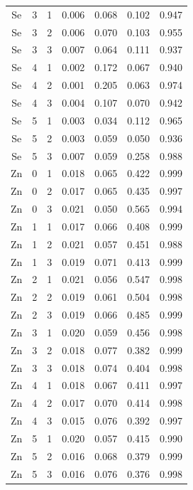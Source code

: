 \documentclass[ms, hidelinks]{uncgdissertationexp}
\theoremstyle{plain}
\theoremstyle{definition}
\theoremstyle{remark}
\begin{document}
\begin{longtable}{ccccccc}
Se & 3 & 1 & 0.006 & 0.068 & 0.102 & 0.947\\
\rowcolor{gray!6}  Se & 3 & 2 & 0.006 & 0.070 & 0.103 & 0.955\\
Se & 3 & 3 & 0.007 & 0.064 & 0.111 & 0.937\\
\rowcolor{gray!6}  Se & 4 & 1 & 0.002 & 0.172 & 0.067 & 0.940\\
Se & 4 & 2 & 0.001 & 0.205 & 0.063 & 0.974\\
\rowcolor{gray!6}  Se & 4 & 3 & 0.004 & 0.107 & 0.070 & 0.942\\
Se & 5 & 1 & 0.003 & 0.034 & 0.112 & 0.965\\
\rowcolor{gray!6}  Se & 5 & 2 & 0.003 & 0.059 & 0.050 & 0.936\\
Se & 5 & 3 & 0.007 & 0.059 & 0.258 & 0.988\\
\rowcolor{gray!6}  Zn & 0 & 1 & 0.018 & 0.065 & 0.422 & 0.999\\
Zn & 0 & 2 & 0.017 & 0.065 & 0.435 & 0.997\\
\rowcolor{gray!6}  Zn & 0 & 3 & 0.021 & 0.050 & 0.565 & 0.994\\
Zn & 1 & 1 & 0.017 & 0.066 & 0.408 & 0.999\\
\rowcolor{gray!6}  Zn & 1 & 2 & 0.021 & 0.057 & 0.451 & 0.988\\
Zn & 1 & 3 & 0.019 & 0.071 & 0.413 & 0.999\\
\rowcolor{gray!6}  Zn & 2 & 1 & 0.021 & 0.056 & 0.547 & 0.998\\
Zn & 2 & 2 & 0.019 & 0.061 & 0.504 & 0.998\\
\rowcolor{gray!6}  Zn & 2 & 3 & 0.019 & 0.066 & 0.485 & 0.999\\
Zn & 3 & 1 & 0.020 & 0.059 & 0.456 & 0.998\\
\rowcolor{gray!6}  Zn & 3 & 2 & 0.018 & 0.077 & 0.382 & 0.999\\
Zn & 3 & 3 & 0.018 & 0.074 & 0.404 & 0.998\\
\rowcolor{gray!6}  Zn & 4 & 1 & 0.018 & 0.067 & 0.411 & 0.997\\
Zn & 4 & 2 & 0.017 & 0.070 & 0.414 & 0.998\\
\rowcolor{gray!6}  Zn & 4 & 3 & 0.015 & 0.076 & 0.392 & 0.997\\
Zn & 5 & 1 & 0.020 & 0.057 & 0.415 & 0.990\\
\rowcolor{gray!6}  Zn & 5 & 2 & 0.016 & 0.068 & 0.379 & 0.999\\
Zn & 5 & 3 & 0.016 & 0.076 & 0.376 & 0.998\\*
\end{longtable}
\clearpage
\end{document}
